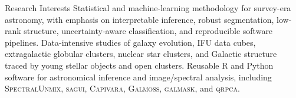 \begin{rubric}{Research Interests}
\entry*[Astrostatistics] Statistical and machine-learning methodology for survey-era astronomy, with emphasis on interpretable inference, robust segmentation, low-rank structure, uncertainty-aware classification, and reproducible software pipelines.
%
 Data-intensive studies of galaxy evolution, IFU data cubes, extragalactic globular clusters, nuclear star clusters, and Galactic structure traced by young stellar objects and open clusters.
%
 Reusable R and Python software for astronomical inference and image/spectral analysis, including \textsc{SpectralUnmix}, \textsc{sagui}, \textsc{Capivara}, \textsc{Galmoss}, \textsc{galmask}, and \textsc{qrpca}.
\end{rubric}
